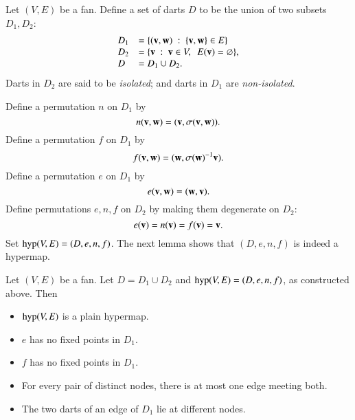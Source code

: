 Let $(V,E)$ be a fan.  Define a set of darts $D$ to be the union of
two subsets $D_1,D_2$:
    $$
    \begin{array}{lll}
    D_1 &= \{({\mathbf v},{\mathbf w})\ :\  \{{\mathbf v},{\mathbf w}\}\in E\}\\
    D_2 &= \{{\mathbf v} \ :\  {\mathbf v}\in V,\ \ E({\mathbf v}) = \varnothing\},\\
    D   &= D_1\cup D_2.
    \end{array}
    $$
Darts in $D_2$ are said to be {\it isolated}; and darts in $D_1$ are {\it non-isolated}.
%
%
%
%
%
%
%

Define a permutation $n$ on $D_1$ by
    $$n({\mathbf v},{\mathbf w}) = ({\mathbf v},\sigma({\mathbf v},{\mathbf w})).$$
Define a permutation $f$ on $D_1$ by
    $$
    f ({\mathbf v},{\mathbf w}) = ({\mathbf w},\sigma({\mathbf w})^{-1} {\mathbf v}).
    $$
Define a permutation $e$ on $D_1$ by
    $$
    e ({\mathbf v},{\mathbf w}) = ({\mathbf w},{\mathbf v}).
    $$
Define permutations $e,n,f$ on $D_2$ by making them degenerate on $D_2$:
    $$
    e ({\mathbf v}) = n({\mathbf v}) = f({\mathbf v}) = {\mathbf v}.
    $$
Set %
${\operatorname{hyp}}(V,E)=(D,e,n,f)$. %
The next lemma shows that $(D,e,n,f)$ is indeed a hypermap.



\begin{lemma}
Let $(V,E)$ be a fan.  Let $D = D_1\cup D_2$
and ${\operatorname{hyp}}(V,E) = (D,e,n,f)$, as constructed above.  Then
    \begin{itemize}
    \item ${\operatorname{hyp}}(V,E)$ is a plain hypermap.
    \item  $e$ has no fixed
points in $D_1$.
    \item  $f$ has no fixed points in $D_1$.
    \item For every pair of distinct nodes, there is at most one
    edge meeting both.
    \item The two darts of an edge of $D_1$ lie at different nodes.
    \end{itemize}
%
\end{lemma}

